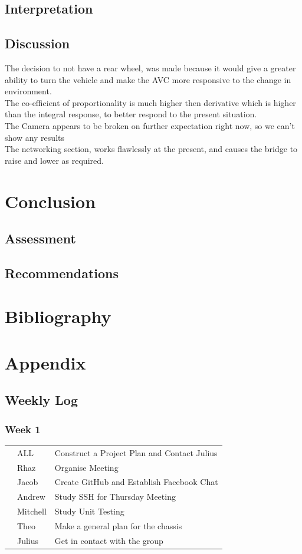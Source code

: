 \documentclass[paper=a4, fontsize=11pt]{scrartcl} %
\def\checkmark{\tikz\fill[scale=0.4] (0,.35) -- (.25,0) -- (1,.7) -- (.25,.15) -- cycle;}
\def\scalecheck{\resizebox{\widthof{\checkmark}*\ratio{\widthof{x}}{\widthof{\normalsize x}}}{!}{\checkmark}}
\numberwithin{equation}{section} %
\numberwithin{figure}{section} %
\begin{document}
\subsection{Interpretation}
\subsection{Discussion}
The decision to not have a rear wheel, was made because it would give a greater
ability to turn the vehicle and make the AVC more responsive to the change in
environment.\\
The co-efficient of proportionality is much higher then derivative which is
higher than the integral response, to better respond to the present situation.\\
The Camera appears to be broken on further expectation right now, so we can't show
any results\\
The networking section, works flawlessly at the present, and causes the bridge
to raise and lower as required.
\section{Conclusion}
\subsection{Assessment}
\subsection{Recommendations}
\section{Bibliography}
\printbibliography{}
\section{Appendix}
\subsection{Weekly Log}
\subsubsection*{Week 1}
\begin{tabularx}{\textwidth}{clX}
  \scalecheck & ALL      & Construct a Project Plan and Contact Julius\\
  \scalecheck & Rhaz     & Organise Meeting\\
  \scalecheck & Jacob    & Create GitHub and Establish Facebook Chat\\
  \scalecheck & Andrew   & Study SSH for Thursday Meeting\\
  \scalecheck & Mitchell & Study Unit Testing\\
  \scalecheck & Theo     & Make a general plan for the chassis\\
  \scalecheck & Julius   & Get in contact with the group
\end{tabularx}
\end{document}
